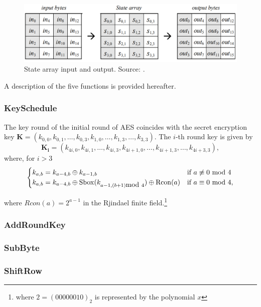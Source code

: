 \begin{figure}
\includegraphics[width = \textwidth]{../Figures/FISP_AES/state.png} 
\caption[State array input and output.]{State array input and output. Source: \cite{nist197}.}\label{fig:AES_state}
\end{figure}

A description of the five functions is provided hereafter.

\subsubsection*{KeySchedule}
The key round of the initial round of AES coincides with the secret encryption key $\boldsymbol{K} = (k_{0,0},k_{0,1},\dots,k_{0,3}, k_{1,0},\dots,k_{1,3},\dots,k_{3,3})$. The $i$-th round key is given by 
\begin{equation*}
\boldsymbol{K_i} = (k_{4i,0},k_{4i,1},\dots,k_{4i,3}, k_{4i+1,0},\dots,k_{4i+1,3},\dots,k_{4i+3,3}),
\end{equation*}
where, for $i>3$
\begin{equation*}
\begin{cases}
k_{a,b} = k_{a-4,b}\oplus k_{a-1,b} & \mbox{if } a \not\equiv 0 \mbox{ mod } 4\\
k_{a,b} = k_{a-4,b}\oplus \mathrm{Sbox}(k_{a-1,(b+1) \mbox{mod } 4}) \oplus \mathrm{Rcon}(a) & \mbox{if } a \equiv 0 \mbox{ mod } 4 \mathrm{,}
\end{cases}
\end{equation*}

where $Rcon(a) = 2^{a-1}$ in the Rjindael finite field.\footnote{where $2=(00000010)_2$ is represented by the polynomial $x$}

\subsubsection*{AddRoundKey}
\subsubsection*{SubByte}
\subsubsection*{ShiftRow}
